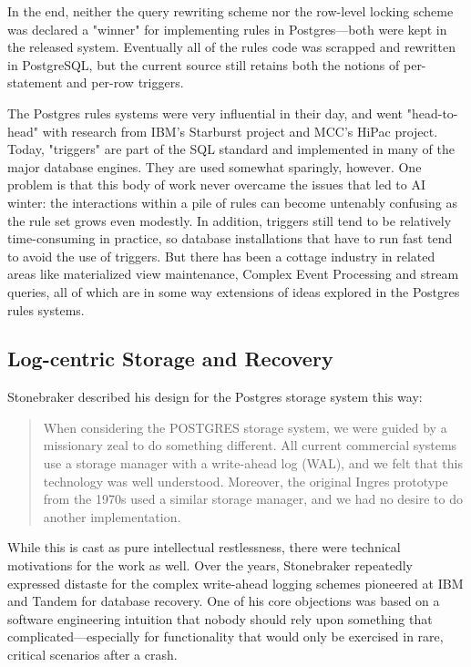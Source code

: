 \documentclass[sigconf,natbib=false]{acmart}
\begin{document}
In the end, neither the query rewriting scheme nor the row-level locking scheme was declared a "winner" for implementing rules in Postgres---both were kept in the released system. Eventually all of the rules code was scrapped and rewritten in PostgreSQL, but the current source still retains both the notions of per-statement and per-row triggers.

The Postgres rules systems were very influential in their day, and went "head-to-head" with research from IBM's Starburst project and MCC's HiPac project. Today, "triggers" are part of the SQL standard and implemented in many of the major database engines. They are used somewhat sparingly, however. One problem is that this body of work never overcame the issues that led to AI winter: the interactions within a pile of rules can become untenably confusing as the rule set grows even modestly. In addition, triggers still tend to be relatively time-consuming in practice, so database installations that have to run fast tend to avoid the use of triggers. But there has been a cottage industry in related areas like materialized view maintenance, Complex Event Processing and stream queries, all of which are in some way extensions of ideas explored in the Postgres rules systems.

\subsection{Log-centric Storage and Recovery}

Stonebraker described his design for the Postgres storage system this way:

\begin{quote}When considering the POSTGRES storage system, we were guided by a missionary zeal to do something different. All current commercial systems use a storage manager with a write-ahead log (WAL), and we felt that this technology was well understood. Moreover, the original Ingres prototype from the 1970s used a similar storage manager, and we had no desire to do another implementation.~\cite{Stonebraker:1991:PNG:125223.125262}
\end{quote}

While this is cast as pure intellectual restlessness, there were technical motivations for the work as well. Over the years, Stonebraker repeatedly expressed distaste for the complex write-ahead logging schemes pioneered at IBM and Tandem for database recovery. One of his core objections was based on a software engineering intuition that nobody should rely upon something that complicated---especially for functionality that would only be exercised in rare, critical scenarios after a crash.
\end{document}
